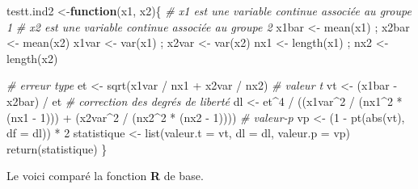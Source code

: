 \documentclass[
]{book}
\newenvironment{Shaded}{}{}
\newcommand{\AttributeTok}[1]{#1}
\newcommand{\CommentTok}[1]{\textit{#1}}
\newcommand{\ControlFlowTok}[1]{\textbf{#1}}
\newcommand{\DecValTok}[1]{#1}
\newcommand{\FunctionTok}[1]{#1}
\newcommand{\NormalTok}[1]{#1}
\newcommand{\OtherTok}[1]{#1}
\newcommand{\SpecialCharTok}[1]{#1}
\begin{document}
\begin{Shaded}
\begin{Highlighting}[]
\NormalTok{testt.ind2 }\OtherTok{\textless{}{-}}\ControlFlowTok{function}\NormalTok{(x1, x2)\{}
  \CommentTok{\# x1 est une variable continue associée au groupe 1}
  \CommentTok{\# x2 est une variable continue associée au groupe 2}
\NormalTok{  x1bar }\OtherTok{\textless{}{-}} \FunctionTok{mean}\NormalTok{(x1) ; x2bar }\OtherTok{\textless{}{-}} \FunctionTok{mean}\NormalTok{(x2)}
\NormalTok{  x1var }\OtherTok{\textless{}{-}} \FunctionTok{var}\NormalTok{(x1) ; x2var }\OtherTok{\textless{}{-}} \FunctionTok{var}\NormalTok{(x2)}
\NormalTok{  nx1 }\OtherTok{\textless{}{-}} \FunctionTok{length}\NormalTok{(x1) ; nx2 }\OtherTok{\textless{}{-}} \FunctionTok{length}\NormalTok{(x2)}
  
  \CommentTok{\# erreur type }
\NormalTok{  et }\OtherTok{\textless{}{-}} \FunctionTok{sqrt}\NormalTok{(x1var }\SpecialCharTok{/}\NormalTok{ nx1 }\SpecialCharTok{+}\NormalTok{ x2var }\SpecialCharTok{/}\NormalTok{ nx2)}
  \CommentTok{\# valeur t}
\NormalTok{  vt }\OtherTok{\textless{}{-}}\NormalTok{ (x1bar }\SpecialCharTok{{-}}\NormalTok{ x2bar) }\SpecialCharTok{/}\NormalTok{ et}
  \CommentTok{\# correction des degrés de liberté}
\NormalTok{  dl }\OtherTok{\textless{}{-}}\NormalTok{ et}\SpecialCharTok{\^{}}\DecValTok{4} \SpecialCharTok{/} 
\NormalTok{    ((x1var}\SpecialCharTok{\^{}}\DecValTok{2} \SpecialCharTok{/}\NormalTok{ (nx1}\SpecialCharTok{\^{}}\DecValTok{2} \SpecialCharTok{*}\NormalTok{ (nx1 }\SpecialCharTok{{-}} \DecValTok{1}\NormalTok{))) }\SpecialCharTok{+}\NormalTok{ (x2var}\SpecialCharTok{\^{}}\DecValTok{2} \SpecialCharTok{/}\NormalTok{ (nx2}\SpecialCharTok{\^{}}\DecValTok{2} \SpecialCharTok{*}\NormalTok{ (nx2 }\SpecialCharTok{{-}} \DecValTok{1}\NormalTok{))))}
  \CommentTok{\# valeur{-}p}
\NormalTok{  vp }\OtherTok{\textless{}{-}}\NormalTok{ (}\DecValTok{1} \SpecialCharTok{{-}} \FunctionTok{pt}\NormalTok{(}\FunctionTok{abs}\NormalTok{(vt), }\AttributeTok{df =}\NormalTok{ dl)) }\SpecialCharTok{*} \DecValTok{2} 
\NormalTok{  statistique }\OtherTok{\textless{}{-}} \FunctionTok{list}\NormalTok{(}\AttributeTok{valeur.t =}\NormalTok{ vt, }\AttributeTok{dl =}\NormalTok{ dl, }\AttributeTok{valeur.p =}\NormalTok{ vp)}
  \FunctionTok{return}\NormalTok{(statistique)}
\NormalTok{\}}
\end{Highlighting}
\end{Shaded}

Le voici comparé la fonction \textbf{R} de base.
\end{document}
